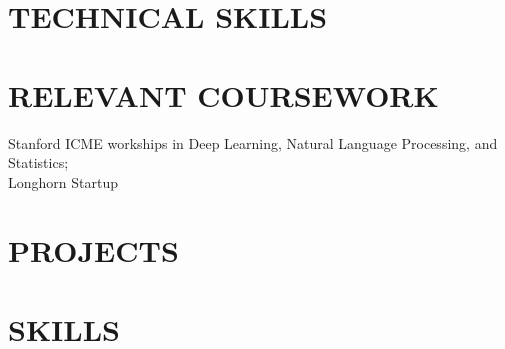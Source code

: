\documentclass{res}
\begin{document}
\begin{resume}
\begin{itemize}
	\end{itemize}

\section{TECHNICAL SKILLS}

\section{RELEVANT COURSEWORK}
	Stanford ICME workships in Deep Learning, Natural Language Processing, and Statistics; \\ Longhorn Startup

\section{PROJECTS}

\section{SKILLS}

\end{resume}
\end{document}
